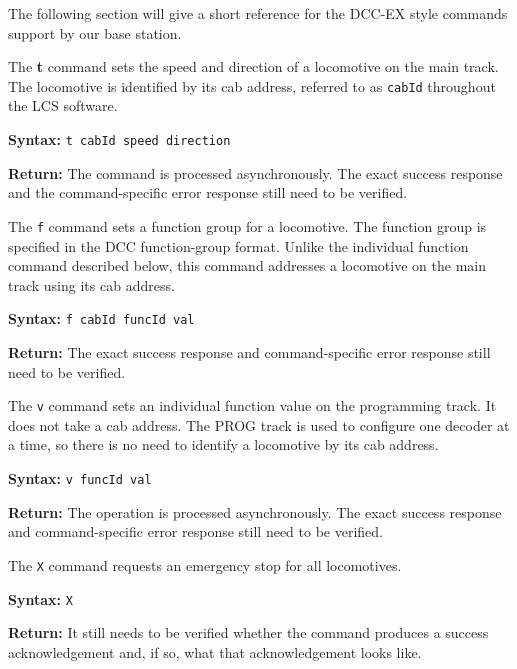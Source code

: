 
The following section will give a short reference for the DCC-EX style commands support by our base station.


The \textbf{t} command sets the speed and direction of a locomotive on the
main track. The locomotive is identified by its cab address, referred to
as \texttt{cabId} throughout the LCS software.

\textbf{Syntax:} \texttt{t cabId speed direction}

\textbf{Return:} The command is processed asynchronously. The exact success
response and the command-specific error response still need to be verified.


The \texttt{f} command sets a function group for a locomotive. The function
group is specified in the DCC function-group format. Unlike the individual
function command described below, this command addresses a locomotive on
the main track using its cab address.

\textbf{Syntax:} \texttt{f cabId funcId val}

\textbf{Return:} The exact success response and command-specific error
response still need to be verified.


The \texttt{v} command sets an individual function value on the programming
track. It does not take a cab address. The PROG track is used to configure
one decoder at a time, so there is no need to identify a locomotive by its
cab address.

\textbf{Syntax:} \texttt{v funcId val}

\textbf{Return:} The operation is processed asynchronously. The exact
success response and command-specific error response still need to be
verified.


The \texttt{X} command requests an emergency stop for all locomotives.

\textbf{Syntax:} \texttt{X}

\textbf{Return:} It still needs to be verified whether the command produces
a success acknowledgement and, if so, what that acknowledgement looks like.


